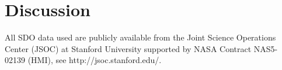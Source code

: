 \documentclass{aa}
\begin{document}

\section{Discussion}

\begin{acknowledgements}
All SDO data used are publicly available from the Joint Science Operations Center (JSOC) at Stanford University supported by NASA Contract NAS5- 02139 (HMI), see http://jsoc.stanford.edu/. 
\end{acknowledgements}

{}

\end{document}
